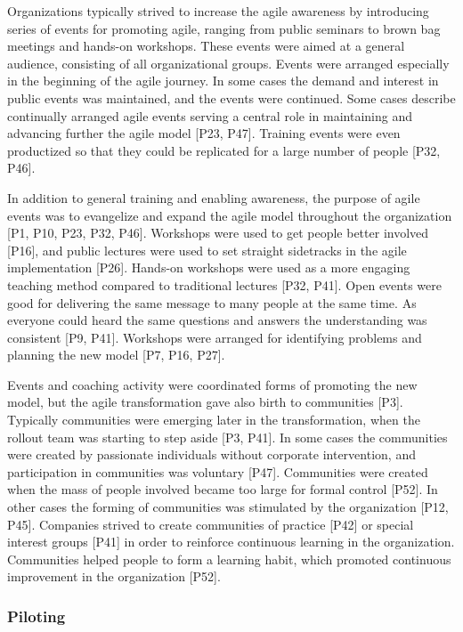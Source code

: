 Organizations typically strived to increase the agile awareness by introducing
series of events for promoting agile, ranging from public seminars to brown bag
meetings and hands-on workshops. These events were aimed at a general audience,
consisting of all organizational groups. Events were arranged especially in the
beginning of the agile journey. In some cases the demand and interest in public
events was maintained, and the events were continued.
Some cases describe continually arranged agile events serving a central role in
maintaining and advancing further the agile model [P23, P47].
Training events were even productized so that they could be replicated for a
large number of people [P32, P46].

In addition to general training and enabling awareness, the purpose of agile
events was to evangelize and expand the agile model throughout the organization
[P1, P10, P23, P32, P46].
Workshops were used to get people better involved [P16], and public lectures
were used to set straight sidetracks in the agile implementation [P26].
Hands-on workshops were used as a more engaging teaching method compared to
traditional lectures [P32, P41]. Open events were good for delivering the same
message to many people at the same time. As everyone could heard the same
questions and answers the understanding was consistent [P9, P41].
Workshops were arranged for identifying problems and planning the new model [P7,
P16, P27].



Events and coaching activity were coordinated forms of promoting the new model,
but the agile transformation gave also birth to communities [P3]. Typically
communities were emerging later in the transformation, when the rollout team
was starting to step aside [P3, P41].
In some cases the communities were created by passionate individuals without
corporate intervention, and participation in communities was voluntary [P47].
Communities were created when the mass of people involved became too large for
formal control [P52].
In other cases the forming of communities was stimulated by the organization
[P12, P45].
Companies strived to create communities of practice [P42] or special interest
groups [P41] in order to reinforce continuous learning in the organization.
Communities helped people to form a learning habit, which promoted continuous
improvement in the organization [P52].


\subsubsection{Piloting}

